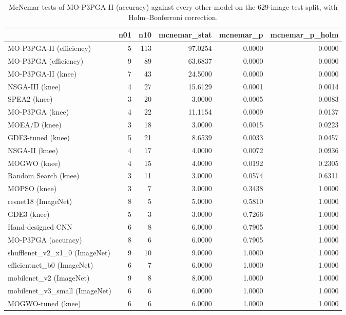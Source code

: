 \begin{table}[htbp]
\centering
\caption{McNemar tests of MO-P3PGA-II (accuracy) against every other model on the 629-image test split, with Holm--Bonferroni correction.}
\label{tab:mcnemar}
\footnotesize
\begin{tabular}{lrrrrr}
\toprule
 & n01 & n10 & mcnemar\_stat & mcnemar\_p & mcnemar\_p\_holm \\
\midrule
MO-P3PGA-II (efficiency) & 5 & 113 & 97.0254 & 0.0000 & 0.0000 \\
MO-P3PGA (efficiency) & 9 & 89 & 63.6837 & 0.0000 & 0.0000 \\
MO-P3PGA-II (knee) & 7 & 43 & 24.5000 & 0.0000 & 0.0000 \\
NSGA-III (knee) & 4 & 27 & 15.6129 & 0.0001 & 0.0014 \\
SPEA2 (knee) & 3 & 20 & 3.0000 & 0.0005 & 0.0083 \\
MO-P3PGA (knee) & 4 & 22 & 11.1154 & 0.0009 & 0.0137 \\
MOEA/D (knee) & 3 & 18 & 3.0000 & 0.0015 & 0.0223 \\
GDE3-tuned (knee) & 5 & 21 & 8.6539 & 0.0033 & 0.0457 \\
NSGA-II (knee) & 4 & 17 & 4.0000 & 0.0072 & 0.0936 \\
MOGWO (knee) & 4 & 15 & 4.0000 & 0.0192 & 0.2305 \\
Random Search (knee) & 3 & 11 & 3.0000 & 0.0574 & 0.6311 \\
MOPSO (knee) & 3 & 7 & 3.0000 & 0.3438 & 1.0000 \\
resnet18 (ImageNet) & 8 & 5 & 5.0000 & 0.5810 & 1.0000 \\
GDE3 (knee) & 5 & 3 & 3.0000 & 0.7266 & 1.0000 \\
Hand-designed CNN & 6 & 8 & 6.0000 & 0.7905 & 1.0000 \\
MO-P3PGA (accuracy) & 8 & 6 & 6.0000 & 0.7905 & 1.0000 \\
shufflenet\_v2\_x1\_0 (ImageNet) & 9 & 10 & 9.0000 & 1.0000 & 1.0000 \\
efficientnet\_b0 (ImageNet) & 6 & 7 & 6.0000 & 1.0000 & 1.0000 \\
mobilenet\_v2 (ImageNet) & 9 & 8 & 8.0000 & 1.0000 & 1.0000 \\
mobilenet\_v3\_small (ImageNet) & 6 & 6 & 6.0000 & 1.0000 & 1.0000 \\
MOGWO-tuned (knee) & 6 & 6 & 6.0000 & 1.0000 & 1.0000 \\
\bottomrule
\end{tabular}
\end{table}
